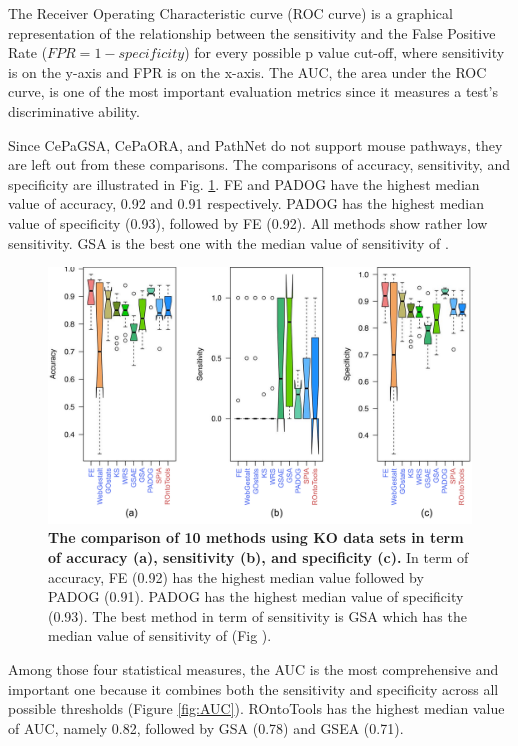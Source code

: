 The Receiver Operating Characteristic curve (ROC curve) is a graphical representation of the relationship between the sensitivity and the False Positive Rate ($FPR = 1-specificity$) for every possible p value cut-off, where sensitivity is on the y-axis and FPR is on the x-axis. The AUC, the area under the ROC curve, is one of the most important evaluation metrics since it measures a test's discriminative ability.
 

Since CePaGSA, CePaORA, and PathNet do not support mouse pathways, they are left out from these comparisons. 
The comparisons of accuracy, sensitivity, and specificity are illustrated in Fig. \ref{fig:AccSenSpe}.
FE and PADOG have the highest median value of accuracy, 0.92 and 0.91 respectively. PADOG has the highest median value of specificity (0.93), followed by FE (0.92). 
All methods show rather low sensitivity. 
GSA is the best one with the median value of sensitivity of . 

\begin{figure}
\centering
  \captionsetup{width=0.7\linewidth}

	\includegraphics[width=1\linewidth]{../Figures/Acc_Sens_Spec_v3}
	\caption{\textbf{The comparison of 10 methods using KO data sets in term of accuracy (a), sensitivity (b), and specificity (c).} In term of accuracy, FE (0.92) has the highest median value followed by PADOG (0.91). PADOG has the highest median value of specificity (0.93). The best method in term of sensitivity is GSA which has the median value of sensitivity of  (Fig \label{fig:AccSenSpe}).}
\end{figure}


Among those four statistical measures, the AUC is the most comprehensive and important one because it combines both the sensitivity and specificity across all possible thresholds (Figure \ref{fig:AUC}).
ROntoTools has the highest median value of AUC, namely 0.82, followed by GSA (0.78) and GSEA (0.71).

